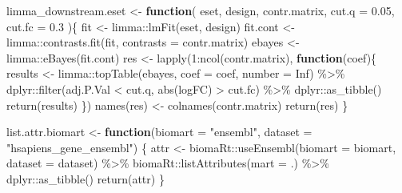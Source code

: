 \documentclass[
]{article}
\newenvironment{Shaded}{\begin{snugshade}}{\end{snugshade}}
\newcommand{\AttributeTok}[1]{\textcolor[rgb]{0.77,0.63,0.00}{#1}}
\newcommand{\ConstantTok}[1]{\textcolor[rgb]{0.00,0.00,0.00}{#1}}
\newcommand{\ControlFlowTok}[1]{\textcolor[rgb]{0.13,0.29,0.53}{\textbf{#1}}}
\newcommand{\DecValTok}[1]{\textcolor[rgb]{0.00,0.00,0.81}{#1}}
\newcommand{\FloatTok}[1]{\textcolor[rgb]{0.00,0.00,0.81}{#1}}
\newcommand{\FunctionTok}[1]{\textcolor[rgb]{0.00,0.00,0.00}{#1}}
\newcommand{\NormalTok}[1]{#1}
\newcommand{\OtherTok}[1]{\textcolor[rgb]{0.56,0.35,0.01}{#1}}
\newcommand{\SpecialCharTok}[1]{\textcolor[rgb]{0.00,0.00,0.00}{#1}}
\newcommand{\StringTok}[1]{\textcolor[rgb]{0.31,0.60,0.02}{#1}}
\begin{document}
\begin{Shaded}
\begin{Highlighting}[]
\NormalTok{limma\_downstream.eset }\OtherTok{\textless{}{-}} 
  \ControlFlowTok{function}\NormalTok{(}
\NormalTok{    eset,}
\NormalTok{    design,}
\NormalTok{    contr.matrix,}
    \AttributeTok{cut.q =} \FloatTok{0.05}\NormalTok{,}
    \AttributeTok{cut.fc =} \FloatTok{0.3}
\NormalTok{    )\{}
\NormalTok{    fit }\OtherTok{\textless{}{-}}\NormalTok{ limma}\SpecialCharTok{::}\FunctionTok{lmFit}\NormalTok{(eset, design)}
\NormalTok{    fit.cont }\OtherTok{\textless{}{-}}\NormalTok{ limma}\SpecialCharTok{::}\FunctionTok{contrasts.fit}\NormalTok{(fit, }\AttributeTok{contrasts =}\NormalTok{ contr.matrix)}
\NormalTok{    ebayes }\OtherTok{\textless{}{-}}\NormalTok{ limma}\SpecialCharTok{::}\FunctionTok{eBayes}\NormalTok{(fit.cont)}
\NormalTok{    res }\OtherTok{\textless{}{-}} \FunctionTok{lapply}\NormalTok{(}\DecValTok{1}\SpecialCharTok{:}\FunctionTok{ncol}\NormalTok{(contr.matrix), }\ControlFlowTok{function}\NormalTok{(coef)\{}
\NormalTok{      results }\OtherTok{\textless{}{-}}\NormalTok{ limma}\SpecialCharTok{::}\FunctionTok{topTable}\NormalTok{(ebayes, }\AttributeTok{coef =}\NormalTok{ coef, }\AttributeTok{number =} \ConstantTok{Inf}\NormalTok{) }\SpecialCharTok{\%\textgreater{}\%} 
\NormalTok{        dplyr}\SpecialCharTok{::}\FunctionTok{filter}\NormalTok{(adj.P.Val }\SpecialCharTok{\textless{}}\NormalTok{ cut.q, }\FunctionTok{abs}\NormalTok{(logFC) }\SpecialCharTok{\textgreater{}}\NormalTok{ cut.fc) }\SpecialCharTok{\%\textgreater{}\%} 
\NormalTok{        dplyr}\SpecialCharTok{::}\FunctionTok{as\_tibble}\NormalTok{() }
      \FunctionTok{return}\NormalTok{(results)}
\NormalTok{    \})}
    \FunctionTok{names}\NormalTok{(res) }\OtherTok{\textless{}{-}} \FunctionTok{colnames}\NormalTok{(contr.matrix)}
    \FunctionTok{return}\NormalTok{(res)}
\NormalTok{  \}}

\NormalTok{list.attr.biomart }\OtherTok{\textless{}{-}} 
  \ControlFlowTok{function}\NormalTok{(}\AttributeTok{biomart =} \StringTok{"ensembl"}\NormalTok{, }\AttributeTok{dataset =} \StringTok{"hsapiens\_gene\_ensembl"}\NormalTok{)}
\NormalTok{  \{}
\NormalTok{    attr }\OtherTok{\textless{}{-}}\NormalTok{ biomaRt}\SpecialCharTok{::}\FunctionTok{useEnsembl}\NormalTok{(}\AttributeTok{biomart =}\NormalTok{ biomart,}
      \AttributeTok{dataset =}\NormalTok{ dataset) }\SpecialCharTok{\%\textgreater{}\%} 
\NormalTok{    biomaRt}\SpecialCharTok{::}\FunctionTok{listAttributes}\NormalTok{(}\AttributeTok{mart =}\NormalTok{ .) }\SpecialCharTok{\%\textgreater{}\%} 
\NormalTok{    dplyr}\SpecialCharTok{::}\FunctionTok{as\_tibble}\NormalTok{()}
  \FunctionTok{return}\NormalTok{(attr)}
\NormalTok{  \}}


\end{Highlighting}
\end{Shaded}
\end{document}
